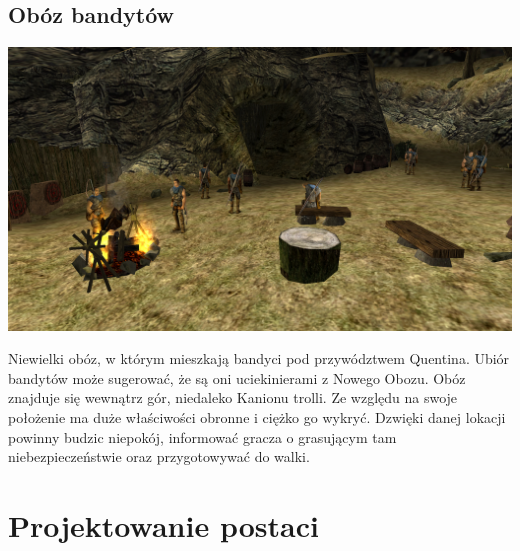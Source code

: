 \documentclass[11pt,polish, openany]{book}
\begin{document}
\section{Obóz bandytów}
\begin{center}
	\includegraphics[scale=0.25]{obozbandytow}
\end{center}
Niewielki obóz, w którym mieszkają bandyci pod przywództwem Quentina. Ubiór bandytów może sugerować, że są oni uciekinierami z Nowego Obozu. Obóz znajduje się wewnątrz gór, niedaleko Kanionu trolli. Ze względu na swoje położenie ma duże właściwości obronne i ciężko go wykryć.
Dzwięki danej lokacji powinny budzic niepokój, informować gracza o grasującym tam niebezpieczeństwie oraz 
przygotowywać do walki.
\chapter{Projektowanie postaci}\label{chapt:model}
\end{document}
